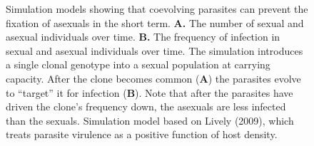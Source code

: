 \documentclass[
  letterpaper,
]{book}
\begin{document}
\begin{figure}


\caption[Simulation models showing that coevolving parasites can prevent
the fixation of asexuals in the short term]{\label{fig-2-3}Simulation
models showing that coevolving parasites can prevent the fixation of
asexuals in the short term. \textbf{A.} The number of sexual and asexual
individuals over time. \textbf{B.} The frequency of infection in sexual
and asexual individuals over time. The simulation introduces a single
clonal genotype into a sexual population at carrying capacity. After the
clone becomes common (\textbf{A}) the parasites evolve to ``target'' it
for infection (\textbf{B}). Note that after the parasites have driven
the clone's frequency down, the asexuals are less infected than the
sexuals. Simulation model based on Lively (2009), which treats parasite
virulence as a positive function of host density.}

\end{figure}%
\end{document}
